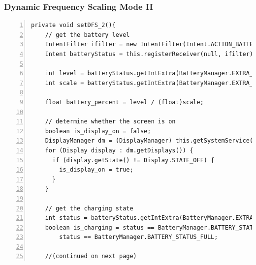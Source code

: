 \documentclass{article} %
\begin{document}
\subsubsection{Dynamic Frequency Scaling Mode II}
\begin{lstlisting}[float=*,caption={Dynamic Frequency Scaling Mode II},label={lst:DFS_2},numbers=left]
  private void setDFS_2(){
    // get the battery level
    IntentFilter ifilter = new IntentFilter(Intent.ACTION_BATTERY_CHANGED);
    Intent batteryStatus = this.registerReceiver(null, ifilter);

    int level = batteryStatus.getIntExtra(BatteryManager.EXTRA_LEVEL, -1);
    int scale = batteryStatus.getIntExtra(BatteryManager.EXTRA_SCALE, -1);

    float battery_percent = level / (float)scale;

    // determine whether the screen is on
    boolean is_display_on = false;
    DisplayManager dm = (DisplayManager) this.getSystemService(Context.DISPLAY_SERVICE);
    for (Display display : dm.getDisplays()) {
      if (display.getState() != Display.STATE_OFF) {
        is_display_on = true;
      }
    }

    // get the charging state
    int status = batteryStatus.getIntExtra(BatteryManager.EXTRA_STATUS, -1);
    boolean is_charging = status == BatteryManager.BATTERY_STATUS_CHARGING ||
        status == BatteryManager.BATTERY_STATUS_FULL;

    //(continued on next page)    
\end{lstlisting}
\end{document}
